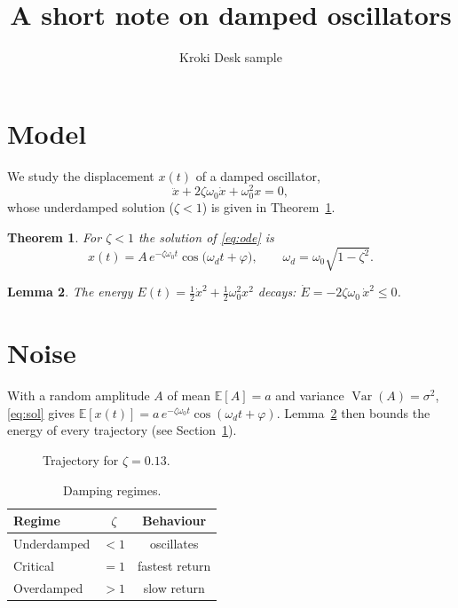 \documentclass{article}
\title{A short note on damped oscillators}
\author{Kroki Desk sample}
\newtheorem{theorem}{Theorem}[section]
\newtheorem{lemma}[theorem]{Lemma}
\newcommand{\E}{\mathbb{E}}
\newcommand{\Var}{\operatorname{Var}}
\begin{document}
\maketitle

\section{Model}\label{sec:model}
We study the displacement $x(t)$ of a damped oscillator,
\begin{equation}\label{eq:ode}
  \ddot x + 2\zeta\omega_0 \dot x + \omega_0^2 x = 0 ,
\end{equation}
whose underdamped solution ($\zeta < 1$) is given in Theorem~\ref{thm:sol}.

\begin{theorem}\label{thm:sol}
For $\zeta<1$ the solution of \eqref{eq:ode} is
\begin{equation}\label{eq:sol}
  x(t) = A\, e^{-\zeta\omega_0 t}\cos\!\big(\omega_d t + \varphi\big),
  \qquad \omega_d = \omega_0\sqrt{1-\zeta^2}.
\end{equation}
\end{theorem}

\begin{lemma}\label{lem:energy}
The energy $E(t)=\tfrac12\dot x^2+\tfrac12\omega_0^2x^2$ decays:
$\dot E = -2\zeta\omega_0\,\dot x^2 \le 0$.
\end{lemma}

\section{Noise}\label{sec:noise}
With a random amplitude $A$ of mean $\E[A]=a$ and variance $\Var(A)=\sigma^2$,
\eqref{eq:sol} gives $\E[x(t)] = a\,e^{-\zeta\omega_0 t}\cos(\omega_d t+\varphi)$.
Lemma~\ref{lem:energy} then bounds the energy of every trajectory
(see Section~\ref{sec:model}).

\begin{figure}
\centering
{}
\caption{Trajectory for $\zeta = 0.13$.}\label{fig:traj}
\end{figure}

\begin{table}
\centering
\begin{tabular}{lcc}
Regime & $\zeta$ & Behaviour \\
\hline
Underdamped & $<1$ & oscillates \\
Critical & $=1$ & fastest return \\
Overdamped & $>1$ & slow return \\
\end{tabular}
\caption{Damping regimes.}
\end{table}
\end{document}
